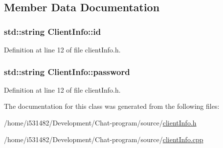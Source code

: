 \subsection{Member Data Documentation}
\subsubsection[{\texorpdfstring{id}{id}}]{\setlength{\rightskip}{0pt plus 5cm}std\+::string Client\+Info\+::id\hspace{0.3cm}{\ttfamily [private]}}\hypertarget{class_client_info_a68ab63d60cc31e1a6cbb7681af5cd053}{}\label{class_client_info_a68ab63d60cc31e1a6cbb7681af5cd053}


Definition at line 12 of file client\+Info.\+h.

\subsubsection[{\texorpdfstring{password}{password}}]{\setlength{\rightskip}{0pt plus 5cm}std\+::string Client\+Info\+::password\hspace{0.3cm}{\ttfamily [private]}}\hypertarget{class_client_info_aef7d99a8255d74631611bee45d401d85}{}\label{class_client_info_aef7d99a8255d74631611bee45d401d85}


Definition at line 12 of file client\+Info.\+h.



The documentation for this class was generated from the following files\+:\begin{DoxyCompactItemize}
\item 
/home/i531482/\+Development/\+Chat-\/program/source/\hyperlink{client_info_8h}{client\+Info.\+h}\item 
/home/i531482/\+Development/\+Chat-\/program/source/\hyperlink{client_info_8cpp}{client\+Info.\+cpp}\end{DoxyCompactItemize}

